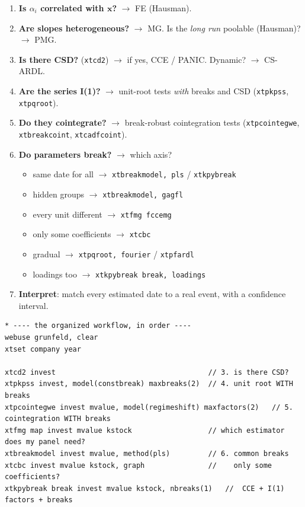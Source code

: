 \documentclass[11pt,a4paper]{article}
\newcommand{\cmd}[1]{\texttt{\textcolor{corange}{#1}}}
\newcommand{\bx}{\mathbf{x}}
\newcommand{\Ito}{I(1)}
\begin{document}
\begin{enumerate}[leftmargin=1.6em,itemsep=2pt]
 \item \textbf{Is $\alpha_i$ correlated with $\bx$?} $\to$ FE (Hausman).
 \item \textbf{Are slopes heterogeneous?} $\to$ MG. Is the \emph{long run} poolable (Hausman)?
 $\to$ PMG.
 \item \textbf{Is there CSD?} (\cmd{xtcd2}) $\to$ if yes, CCE / PANIC. Dynamic? $\to$ CS-ARDL.
 \item \textbf{Are the series \Ito?} $\to$ unit-root tests \emph{with} breaks and CSD
 (\cmd{xtpkpss}, \cmd{xtpqroot}).
 \item \textbf{Do they cointegrate?} $\to$ break-robust cointegration tests
 (\cmd{xtpcointegwe}, \cmd{xtbreakcoint}, \cmd{xtcadfcoint}).
 \item \textbf{Do parameters break?} $\to$ which axis?
 \begin{itemize}[leftmargin=1.2em,itemsep=0pt]
  \item same date for all $\to$ \cmd{xtbreakmodel, pls} / \cmd{xtkpybreak}
  \item hidden groups $\to$ \cmd{xtbreakmodel, gagfl}
  \item every unit different $\to$ \cmd{xtfmg fccemg}
  \item only some coefficients $\to$ \cmd{xtcbc}
  \item gradual $\to$ \cmd{xtpqroot, fourier} / \cmd{xtpfardl}
  \item loadings too $\to$ \cmd{xtkpybreak break, loadings}
 \end{itemize}
 \item \textbf{Interpret}: match every estimated date to a real event, with a confidence interval.
\end{enumerate}

\begin{lstlisting}
* ---- the organized workflow, in order ----
webuse grunfeld, clear
xtset company year

xtcd2 invest                                    // 3. is there CSD?
xtpkpss invest, model(constbreak) maxbreaks(2)  // 4. unit root WITH breaks
xtpcointegwe invest mvalue, model(regimeshift) maxfactors(2)   // 5. cointegration WITH breaks
xtfmg map invest mvalue kstock                  // which estimator does my panel need?
xtbreakmodel invest mvalue, method(pls)         // 6. common breaks
xtcbc invest mvalue kstock, graph               //    only some coefficients?
xtkpybreak break invest mvalue kstock, nbreaks(1)   //  CCE + I(1) factors + breaks
\end{lstlisting}
\end{document}
